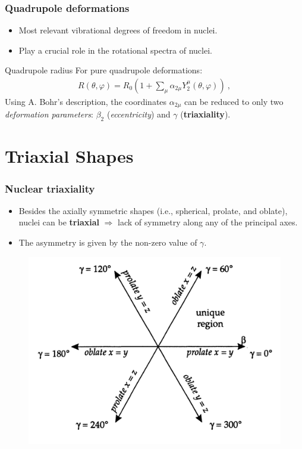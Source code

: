 \documentclass{beamer}
\begin{document}
\begin{frame}
  \frametitle{Quadrupole deformations}
  \begin{itemize}
    \item Most relevant vibrational degrees of freedom in nuclei.
    \item Play a crucial role in the rotational spectra of nuclei.
  \end{itemize}
\begin{block}{Quadrupole radius}
  For pure quadrupole deformations:
  \begin{align}
    R(\theta,\varphi)=R_0\left(1+\sum_\mu\alpha_{2\mu}Y_2^\mu(\theta,\varphi)\right)\ ,
  \end{align}
  Using A. Bohr's description, the coordinates $\alpha_{2\mu}$ can be reduced to only two \emph{deformation parameters}: $\beta_2$ (\emph{eccentricity}) and $\gamma$ (\textbf{triaxiality}).
\end{block}
\end{frame}

\section{Triaxial Shapes}

\begin{frame}
  \frametitle{Nuclear triaxiality}
\begin{itemize}
  \item Besides the axially symmetric shapes (i.e., spherical, prolate, and oblate), nuclei can be \textbf{triaxial} $\Longrightarrow$ lack of symmetry along any of the principal axes.
  \item The asymmetry is given by the non-zero value of $\gamma$.
\end{itemize}
\begin{figure}
\includegraphics[scale=0.25]{figures/beta-gamma-plane.png}  
\end{figure}
\end{frame}
\end{document}
